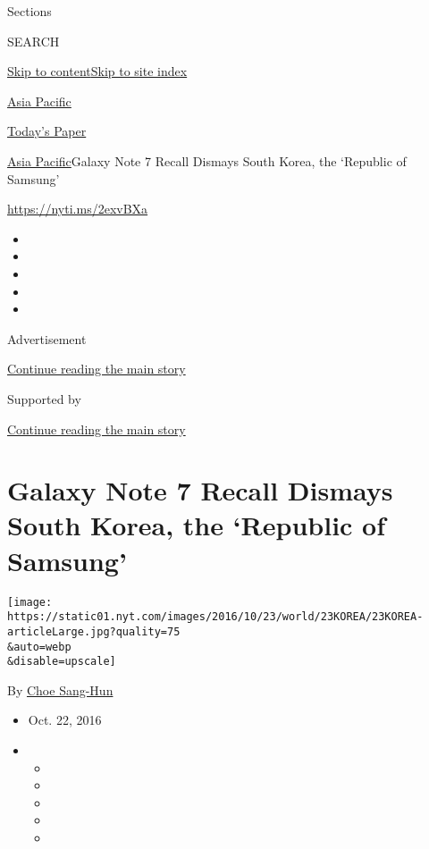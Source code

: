 Sections

SEARCH

\protect\hyperlink{site-content}{Skip to
content}\protect\hyperlink{site-index}{Skip to site index}

\href{https://www.nytimes.com/section/world/asia}{Asia Pacific}

\href{https://myaccount.nytimes.com/auth/login?response_type=cookie\&client_id=vi}{}

\href{https://www.nytimes.com/section/todayspaper}{Today's Paper}

\href{/section/world/asia}{Asia Pacific}\textbar{}Galaxy Note 7 Recall
Dismays South Korea, the `Republic of Samsung'

\url{https://nyti.ms/2exvBXa}

\begin{itemize}
\item
\item
\item
\item
\item
\end{itemize}

Advertisement

\protect\hyperlink{after-top}{Continue reading the main story}

Supported by

\protect\hyperlink{after-sponsor}{Continue reading the main story}

\hypertarget{galaxy-note-7-recall-dismays-south-korea-the-republic-of-samsung}{%
\section{Galaxy Note 7 Recall Dismays South Korea, the `Republic of
Samsung'}\label{galaxy-note-7-recall-dismays-south-korea-the-republic-of-samsung}}

\texttt{[image: https://static01.nyt.com/images/2016/10/23/world/23KOREA/23KOREA-articleLarge.jpg?quality=75\\\&auto=webp\\\&disable=upscale]}

By \href{http://www.nytimes.com/by/choe-sang-hun}{Choe Sang-Hun}

\begin{itemize}
\item
  Oct. 22, 2016
\item
  \begin{itemize}
  \item
  \item
  \item
  \item
  \item
  \end{itemize}
\end{itemize}

